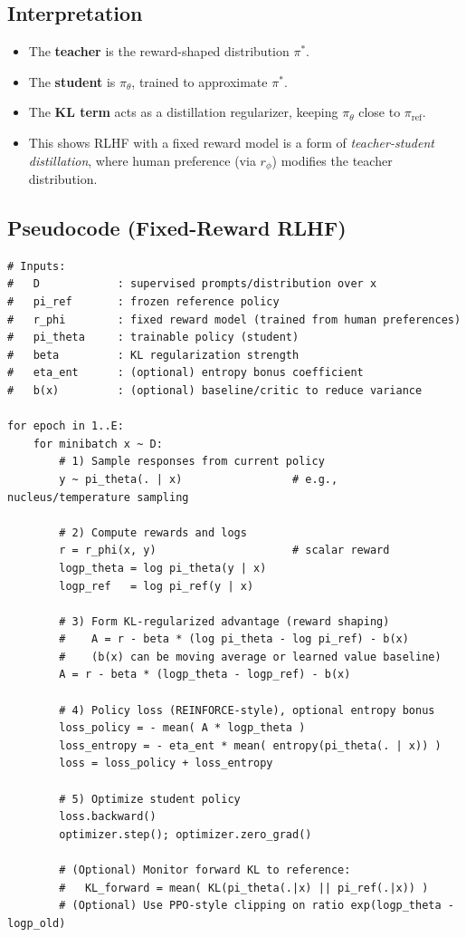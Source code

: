 \documentclass[11pt]{article}
\theoremstyle{remark}
\begin{document}
\subsection{Interpretation}
\begin{itemize}
    \item The \textbf{teacher} is the reward-shaped distribution $\pi^*$.
    \item The \textbf{student} is $\pi_\theta$, trained to approximate $\pi^*$.
    \item The \textbf{KL term} acts as a distillation regularizer, keeping $\pi_\theta$ close to $\pi_{\text{ref}}$.
    \item This shows RLHF with a fixed reward model is a form of
    \emph{teacher-student distillation}, where human preference (via $r_\phi$)
    modifies the teacher distribution.
\end{itemize}

\subsection{Pseudocode (Fixed-Reward RLHF)}
\begin{verbatim}
# Inputs:
#   D            : supervised prompts/distribution over x
#   pi_ref       : frozen reference policy
#   r_phi        : fixed reward model (trained from human preferences)
#   pi_theta     : trainable policy (student)
#   beta         : KL regularization strength
#   eta_ent      : (optional) entropy bonus coefficient
#   b(x)         : (optional) baseline/critic to reduce variance

for epoch in 1..E:
    for minibatch x ~ D:
        # 1) Sample responses from current policy
        y ~ pi_theta(. | x)                 # e.g., nucleus/temperature sampling

        # 2) Compute rewards and logs
        r = r_phi(x, y)                     # scalar reward
        logp_theta = log pi_theta(y | x)
        logp_ref   = log pi_ref(y | x)

        # 3) Form KL-regularized advantage (reward shaping)
        #    A = r - beta * (log pi_theta - log pi_ref) - b(x)
        #    (b(x) can be moving average or learned value baseline)
        A = r - beta * (logp_theta - logp_ref) - b(x)

        # 4) Policy loss (REINFORCE-style), optional entropy bonus
        loss_policy = - mean( A * logp_theta )
        loss_entropy = - eta_ent * mean( entropy(pi_theta(. | x)) )
        loss = loss_policy + loss_entropy

        # 5) Optimize student policy
        loss.backward()
        optimizer.step(); optimizer.zero_grad()

        # (Optional) Monitor forward KL to reference:
        #   KL_forward = mean( KL(pi_theta(.|x) || pi_ref(.|x)) )
        # (Optional) Use PPO-style clipping on ratio exp(logp_theta - logp_old)
\end{verbatim}
\end{document}
